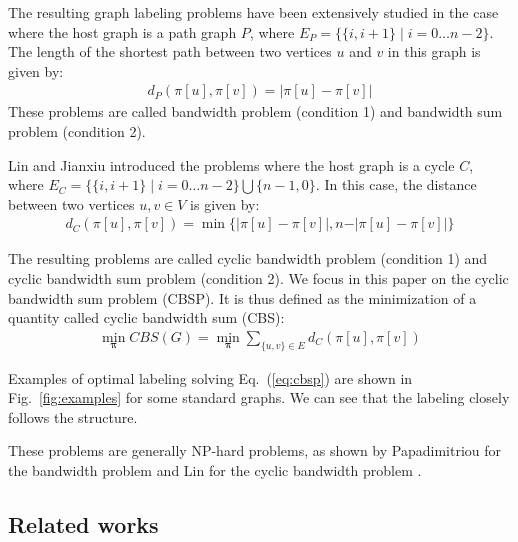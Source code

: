 \documentclass{scrartcl}
\theoremstyle{plain}
\newcommand{\cbs}{CBS}
\newcommand{\cbsp}{CBSP}
\begin{document}
The resulting graph labeling problems have been extensively studied in the case 
where the host graph is a path graph $P$, where $E_P=\lbrace \{i,i+1\}\mid 
i=0\dots n-2\rbrace$. The length of the shortest path between two vertices $u$ 
and $v$ in this graph is given by:
\begin{align}
d_P(\pi[u], \pi[v]) = \vert \pi[u]-\pi[v] \vert
\end{align}
These problems are called bandwidth problem (condition 1) and bandwidth sum 
problem (condition 2).

Lin \cite{Lin1994} and Jianxiu \cite{Jianxiu2001} introduced the problems where 
the host graph is a cycle $C$, where $E_C=\lbrace \{i,i+1\}\mid i=0\dots 
n-2\rbrace \bigcup \{n-1,0\}$. In this case, the distance 
between two vertices $u,v \in V$ is given by:
\begin{align}
\label{eq:dc}
d_C(\pi[u], \pi[v]) = \min\lbrace\vert \pi[u]-\pi[v]\vert, n-\vert \pi[u]-\pi[v] 
\vert\rbrace
\end{align}

The resulting problems are called cyclic bandwidth problem (condition 1) and 
cyclic bandwidth sum problem (condition 2). We focus in this paper on the cyclic 
bandwidth sum problem (\cbsp{}). It is thus defined as the minimization of a 
quantity called cyclic bandwidth sum (\cbs{}):
\begin{eqnarray}
\label{eq:cbsp}
\min_{\mathbf{\pi}} \cbs(G) = \min_{\mathbf{\pi}} \sum_{\{u,v\}\in E} 
d_C(\pi[u], \pi[v])
\end{eqnarray}

Examples of optimal labeling solving Eq.~(\ref{eq:cbsp}) are shown in 
Fig.~\ref{fig:examples} for some standard graphs. We can see that the labeling 
closely follows the structure.

These problems are generally NP-hard problems, as shown by Papadimitriou for the 
bandwidth problem \cite{Papadimitriou1976}  and Lin  for the cyclic bandwidth 
problem \cite{Lin1994}.

\subsection{Related works}
\end{document}
